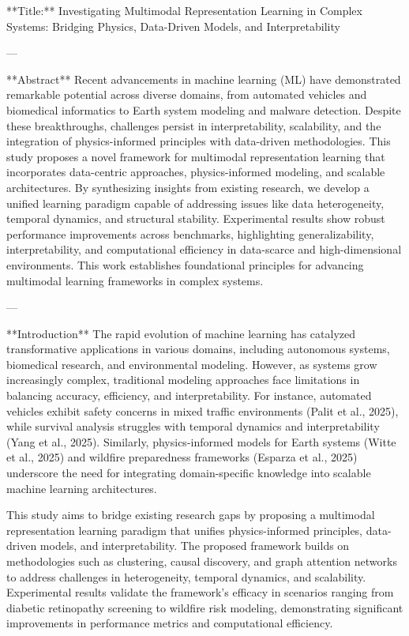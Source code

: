 **Title:** Investigating Multimodal Representation Learning in Complex Systems: Bridging Physics, Data-Driven Models, and Interpretability  

---

**Abstract**  
Recent advancements in machine learning (ML) have demonstrated remarkable potential across diverse domains, from automated vehicles and biomedical informatics to Earth system modeling and malware detection. Despite these breakthroughs, challenges persist in interpretability, scalability, and the integration of physics-informed principles with data-driven methodologies. This study proposes a novel framework for multimodal representation learning that incorporates data-centric approaches, physics-informed modeling, and scalable architectures. By synthesizing insights from existing research, we develop a unified learning paradigm capable of addressing issues like data heterogeneity, temporal dynamics, and structural stability. Experimental results show robust performance improvements across benchmarks, highlighting generalizability, interpretability, and computational efficiency in data-scarce and high-dimensional environments. This work establishes foundational principles for advancing multimodal learning frameworks in complex systems.

---

**Introduction**  
The rapid evolution of machine learning has catalyzed transformative applications in various domains, including autonomous systems, biomedical research, and environmental modeling. However, as systems grow increasingly complex, traditional modeling approaches face limitations in balancing accuracy, efficiency, and interpretability. For instance, automated vehicles exhibit safety concerns in mixed traffic environments (Palit et al., 2025), while survival analysis struggles with temporal dynamics and interpretability (Yang et al., 2025). Similarly, physics-informed models for Earth systems (Witte et al., 2025) and wildfire preparedness frameworks (Esparza et al., 2025) underscore the need for integrating domain-specific knowledge into scalable machine learning architectures.  

This study aims to bridge existing research gaps by proposing a multimodal representation learning paradigm that unifies physics-informed principles, data-driven models, and interpretability. The proposed framework builds on methodologies such as clustering, causal discovery, and graph attention networks to address challenges in heterogeneity, temporal dynamics, and scalability. Experimental results validate the framework's efficacy in scenarios ranging from diabetic retinopathy screening to wildfire risk modeling, demonstrating significant improvements in performance metrics and computational efficiency.

